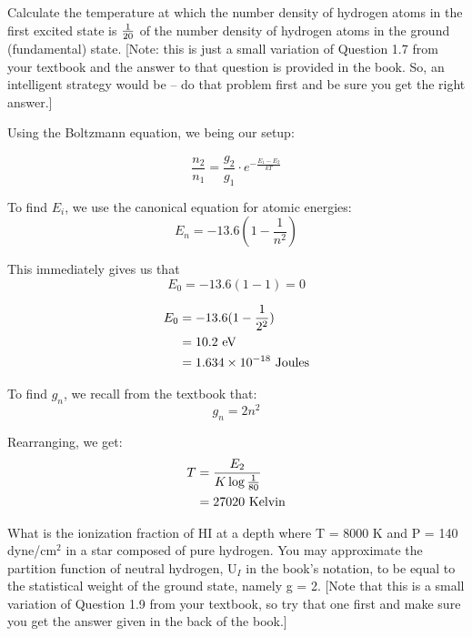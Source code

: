\documentclass[12pt]{article}
\newenvironment{problem}[2][Problem]{\begin{trivlist}
\item[\hskip \labelsep {\bfseries #1}\hskip \labelsep {\bfseries #2.}]}{\end{trivlist}}
\newenvironment{answer}[2][Answer]{\begin{trivlist}
\item[\hskip \labelsep {\bfseries #1}\hskip \labelsep {\bfseries #2.}]}{\end{trivlist}}
\begin{document}
\bigskip
\bigskip

\begin{problem}{2}
Calculate the temperature at which the number density of hydrogen atoms in the first excited state is $1 \over 20$ of the number density of hydrogen atoms in the ground (fundamental) state. [Note: this is just a small variation of Question 1.7 from your textbook and the answer to that question is provided in the book. So, an intelligent strategy would be -- do that problem first and be sure you get the right answer.]
\end{problem}

\begin{answer}{2}

Using the Boltzmann equation, we being our setup:

\begin{equation}
  \frac{n_{2}}{n_{1}} = \frac{g_{2}}{g_{1}} \cdot e^{- \frac{E_{1} - E_{2}}{kT}}
\end{equation}

To find $E_{i}$, we use the canonical equation for atomic energies:
\begin{equation}
  E_n = -13.6(1 - \frac{1}{n^2})
\end{equation}

This immediately gives us that
\begin{equation}
  E_0 = -13.6(1-1) = 0
\end{equation}

\begin{align}
  E_0 &= -13.6(1-\frac{1}{2^2}) \notag  \\
      &= 10.2 \text{ eV} \notag  \\
      &= 1.634 \times 10^{-18} \text{ Joules}
\end{align}

To find $g_n$, we recall from the textbook that:
\begin{equation}
  g_n = 2 n^2
\end{equation}

Rearranging, we get:
\begin{align}
  T &= \frac{E_2}{K \log{\frac{1}{80}}}  \notag \\
    &= 27020 \text{ Kelvin}
\end{align}

\end{answer}
\bigskip
\bigskip

\begin{problem}{3}
What is the ionization fraction of HI at a depth where T = 8000 K and P = 140 dyne/cm$^2$ in a star composed of pure hydrogen. You may approximate the partition function of neutral hydrogen, U$_I$ in the book's notation, to be equal to the statistical weight of the ground state, namely g = 2. [Note that this is a small variation of Question 1.9 from your textbook, so try that one first and make sure you get the answer given in the back of the book.]
\end{problem}
\end{document}
